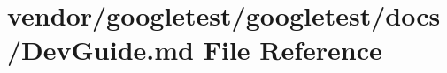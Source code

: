 \hypertarget{googletest_2docs_2_dev_guide_8md}{}\section{vendor/googletest/googletest/docs/\+Dev\+Guide.md File Reference}
\label{googletest_2docs_2_dev_guide_8md}
